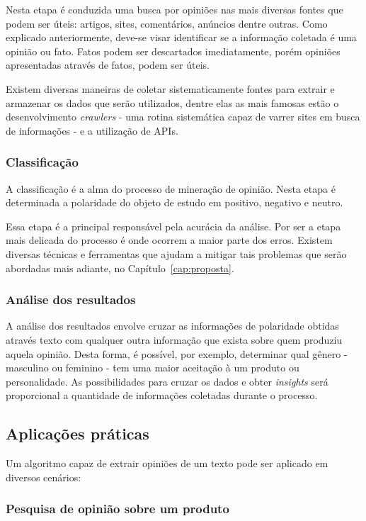 Nesta etapa é conduzida uma busca por opiniões nas mais diversas fontes que podem ser úteis: artigos, sites, comentários, anúncios dentre outras. Como explicado anteriormente, deve-se visar identificar se a informação coletada é uma opinião ou fato. Fatos podem ser descartados imediatamente, porém opiniões apresentadas através de fatos, podem ser úteis.

Existem diversas maneiras de coletar sistematicamente fontes para extrair e armazenar os dados que serão utilizados, dentre elas as mais famosas estão o desenvolvimento \textit{crawlers} - uma rotina sistemática capaz de varrer sites em busca de informações - e a utilização de APIs.

\subsubsection{Classificação}

A classificação é a alma do processo de mineração de opinião. Nesta etapa é determinada a polaridade do objeto de estudo em positivo, negativo e neutro.

Essa etapa é a principal responsável pela acurácia da análise. Por ser a etapa mais delicada do processo é onde ocorrem a maior parte dos erros. Existem diversas técnicas e ferramentas que ajudam a mitigar tais problemas que serão abordadas mais adiante, no Capítulo~\ref{cap:proposta}.

\subsubsection{Análise dos resultados}

A análise dos resultados envolve cruzar as informações de polaridade obtidas através texto com qualquer outra informação que exista sobre quem produziu aquela opinião. Desta forma, é possível, por exemplo, determinar qual gênero - masculino ou feminino - tem uma maior aceitação à um produto ou personalidade. As possibilidades para cruzar os dados e obter \textit{insights} será proporcional a quantidade de informações coletadas durante o processo.

\subsection{Aplicações práticas}

Um algoritmo capaz de extrair opiniões de um texto pode ser aplicado em diversos cenários:

\subsubsection{Pesquisa de opinião sobre um produto}

